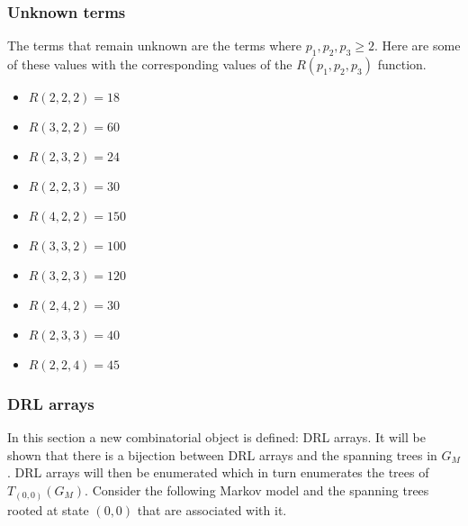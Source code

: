 \subsubsection{Unknown terms}

The terms that remain unknown are the terms where \(p_1, p_2, p_3 \geq 2\). 
Here are some of these values with the corresponding values of the 
\(R(p_1,p_2,p_3)\) function.

\begin{multicols}{2}
    \begin{itemize}
        \item \(R(2,2,2) = 18\) 
        \item \(R(3,2,2) = 60\)
        \item \(R(2,3,2) = 24\)
        \item \(R(2,2,3) = 30\)
        \item \(R(4,2,2) = 150\)
        \item \(R(3,3,2) = 100\)
        \item \(R(3,2,3) = 120\)
        \item \(R(2,4,2) = 30\)
        \item \(R(2,3,3) = 40\)
        \item \(R(2,2,4) = 45\)
    \end{itemize}
\end{multicols}

\subsubsection{DRL arrays}

In this section a new combinatorial object is defined: DRL arrays. 
It will be shown that there is a bijection between DRL arrays and the spanning 
trees in \(G_M\).
DRL arrays will then be enumerated which in turn enumerates the trees of 
\(T_{(0,0)}(G_M)\).
Consider the following Markov model and the spanning trees rooted at state 
\((0,0)\) that are associated with it. 

\begin{figure}[h]
    \centering
    \scalebox{0.8}{
        } 
        \vspace{0.8cm} \\
    \scalebox{0.6}{
        } 
        \hspace{0.7cm}
    \scalebox{0.6}{
        } 
        \vspace{0.4cm} \\
    \scalebox{0.6}{
        } 
        \hspace{0.7cm}
    \scalebox{0.6}{
        }
        \vspace{0.4cm} \\
    \scalebox{0.6}{
        }
\end{figure}


